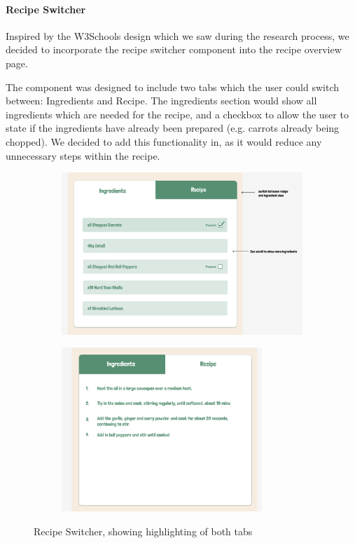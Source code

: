 \documentclass{article}
\begin{document}
\paragraph{Recipe Switcher}
Inspired by the W3Schools design which we saw during the research process, we decided to incorporate the recipe switcher component into the recipe overview page.

The component was designed to include two tabs which the user could switch between: Ingredients and Recipe. The ingredients section would show all ingredients which are needed for the recipe, and a checkbox to allow the user to state if the ingredients have already been prepared (e.g. carrots already being chopped). We decided to add this functionality in, as it would reduce any unnecessary steps within the recipe.
\begin{figure}[t]
  \centering
  \begin{subfigure}{0.45\linewidth}
    \includegraphics[width=\textwidth]{assets/Version 1 Recipe Switcher ingredients.png}
  \end{subfigure}
  \hfill
  \begin{subfigure}{0.45\linewidth}
    \includegraphics[width=0.83\textwidth]{assets/Version 1 Recipe Switcher recipe.png}
  \end{subfigure}
  \caption{Recipe Switcher, showing highlighting of both tabs}
\end{figure}
\end{document}
